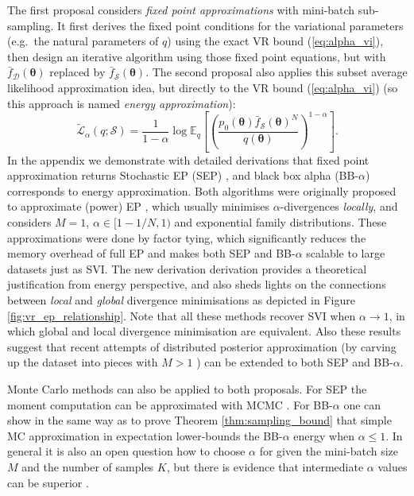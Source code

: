 The first proposal considers \emph{fixed point approximations} with mini-batch sub-sampling. It first derives the fixed point conditions for the variational parameters (e.g.~the natural parameters of $q$) using the exact VR bound (\ref{eq:alpha_vi}), then design an iterative algorithm using those fixed point equations, but with $\bar{f}_{\mathcal{D}}(\bm{\theta})$ replaced by $\bar{f}_{\mathcal{S}}(\bm{\theta})$.
%
The second proposal also applies this subset average likelihood approximation idea, but directly to the VR bound (\ref{eq:alpha_vi}) (so this approach is named \emph{energy approximation}):
\begin{equation}
\label{eq:alpha_vi_approx}
\tilde{\mathcal{L}}_{\alpha}(q; \mathcal{S}) 
	= \frac{1}{1 - \alpha} \log \mathbb{E}_{q} \left[ \left( \frac{p_0(\bm{\theta}) \bar{f}_{\mathcal{S}}(\bm{\theta})^N} {q(\bm{\theta})} \right)^{1 - \alpha} \right].
\end{equation}
%
In the appendix we demonstrate with detailed derivations that fixed point approximation returns Stochastic EP (SEP) \cite{li:sep}, and black box alpha (BB-$\alpha$) \cite{hernandez-lobato:bb-alpha} corresponds to energy approximation. Both algorithms were originally proposed to approximate (power) EP \cite{minka:ep, minka:powerep}, which usually minimises $\alpha$-divergences \emph{locally}, and considers $M=1$, $\alpha \in [1 - 1/N, 1)$ and exponential family distributions. These approximations were done by factor tying, which significantly reduces the memory overhead of full EP and makes both SEP and BB-$\alpha$ scalable to large datasets just as SVI. The new derivation derivation provides a theoretical justification from energy perspective, and also sheds lights on the connections between \emph{local} and \emph{global} divergence minimisations as depicted in Figure \ref{fig:vr_ep_relationship}. Note that all these methods recover SVI when $\alpha \rightarrow 1$, in which global and local divergence minimisation are equivalent. Also these results suggest that recent attempts of distributed posterior approximation (by carving up the dataset into pieces with $M > 1$ \cite{gelman:dep, xu:sms}) can be extended to both SEP and BB-$\alpha$.

%
Monte Carlo methods can also be applied to both proposals. For SEP the moment computation can be approximated with MCMC \cite{gelman:dep, xu:sms}. For BB-$\alpha$ one can show in the same way as to prove Theorem \ref{thm:sampling_bound} that simple MC approximation in expectation lower-bounds the BB-$\alpha$ energy when $\alpha \leq 1$. In general it is also an open question how to choose $\alpha$ for given the mini-batch size $M$ and the number of samples $K$, but there is evidence that intermediate $\alpha$ values can be superior \citep{bui:dgp, depeweg:bnn_rl}.